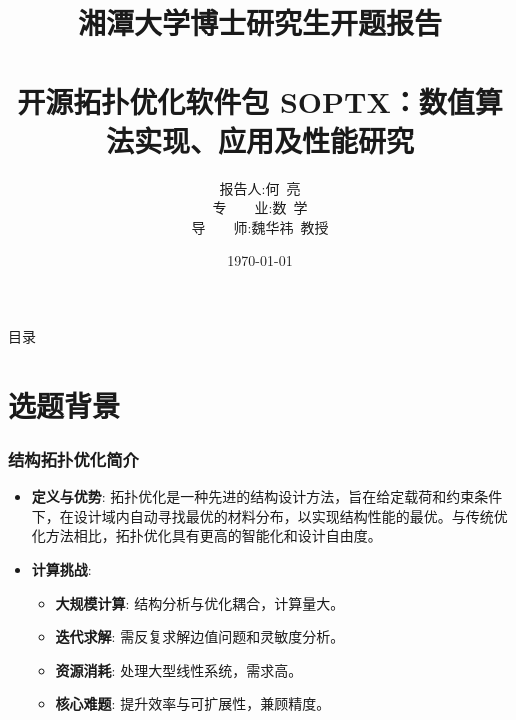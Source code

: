 \documentclass{beamer}  %
\title{{\small
湘潭大学博士研究生开题报告} \\
~~~~\\
开源拓扑优化软件包 SOPTX：数值算法实现、应用及性能研究}
\author{
	\begin{tabular}{rl}
		报告人: & 何~亮 \\
		专~~~~业: & 数~学 \\
		导~~~~师: & 魏华祎~教授 \\
	\end{tabular}
}
\institute[XTU]{
\vspace{5pt}
湘潭大学$\bullet$数学与计算科学学院\\
}
\date[XTU]{\today}  %
\numberwithin{subsection}{section}             %
\begin{document}
\begin{frame}
  \titlepage
\end{frame}

\begin{frame}{目录}
  \tableofcontents
\end{frame}

\section{选题背景}
\begin{frame}
\frametitle{结构拓扑优化简介}
\small{
\begin{itemize}
	\item \textbf{定义与优势}: 拓扑优化是一种先进的结构设计方法，旨在给定载荷和约束条件下，在设计域内自动寻找最优的材料分布，以实现结构性能的最优。与传统优化方法相比，拓扑优化具有更高的智能化和设计自由度。
	
	\item \textbf{计算挑战}:
	\begin{itemize}
		\item \textbf{大规模计算}: 结构分析与优化耦合，计算量大。
		
		\item \textbf{迭代求解}: 需反复求解边值问题和灵敏度分析。
		
		\item \textbf{资源消耗}: 处理大型线性系统，需求高。
		
		\item \textbf{核心难题}: 提升效率与可扩展性，兼顾精度。
	\end{itemize}
\end{itemize}
}
\end{frame}
\end{document}
